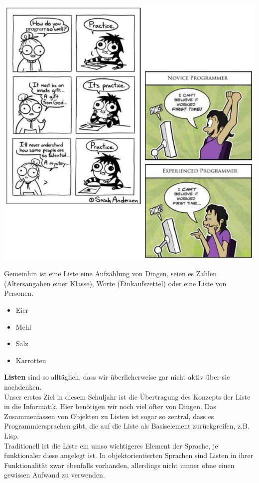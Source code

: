 \documentclass{article}
\begin{document}
\begin{center}
\includegraphics[scale = 0.8]{../media/starting_cartoon.png}
\end{center}
\newpage
Gemeinhin ist eine Liste eine Aufzählung von Dingen, seien es Zahlen (Altersangaben einer Klasse), Worte 
(Einkaufszettel) oder eine Liste von Personen. 
\begin{itemize}
    \item Eier
    \item Mehl
    \item Salz
    \item Karrotten
\end{itemize}
\textbf{Listen} sind so alltäglich, dass wir überlicherweise gar nicht aktiv über sie nachdenken. \\
Unser erstes Ziel in diesem Schuljahr ist die Übertragung des Konzepts der Liste in die Informatik. 
Hier benötigen wir noch viel öfter \textbf{} von Dingen.
Das Zusammenfassen von Objekten zu Listen ist sogar so zentral, dass es  Programmiersprachen gibt,
die auf die Liste als Basiselement zurückgreifen, z.B. Lisp. \\
Traditionell ist die Liste ein umso wichtigeres Element der Sprache, je funktionaler diese angelegt ist. In objektorientierten Sprachen sind Listen in ihrer Funktionalität zwar ebenfalls vorhanden, allerdings nicht immer ohne einen gewissen Aufwand zu verwenden. \\
\end{document}
